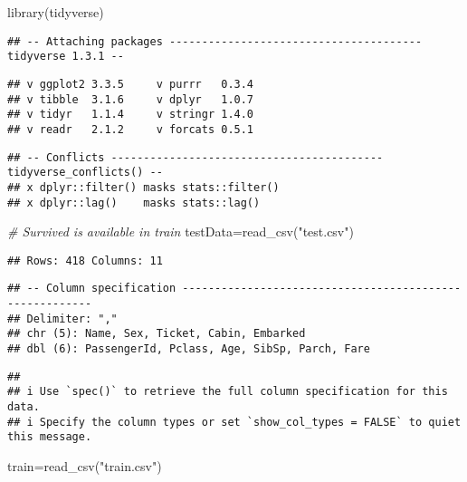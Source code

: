\documentclass[
]{article}
\author{}
\date{\vspace{-2.5em}}
\newenvironment{Shaded}{\begin{snugshade}}{\end{snugshade}}
\newcommand{\CommentTok}[1]{\textcolor[rgb]{0.56,0.35,0.01}{\textit{#1}}}
\newcommand{\FunctionTok}[1]{\textcolor[rgb]{0.00,0.00,0.00}{#1}}
\newcommand{\NormalTok}[1]{#1}
\newcommand{\OtherTok}[1]{\textcolor[rgb]{0.56,0.35,0.01}{#1}}
\newcommand{\StringTok}[1]{\textcolor[rgb]{0.31,0.60,0.02}{#1}}
\begin{document}
\begin{Shaded}
\begin{Highlighting}[]
\FunctionTok{library}\NormalTok{(tidyverse)}
\end{Highlighting}
\end{Shaded}

\begin{verbatim}
## -- Attaching packages --------------------------------------- tidyverse 1.3.1 --
\end{verbatim}

\begin{verbatim}
## v ggplot2 3.3.5     v purrr   0.3.4
## v tibble  3.1.6     v dplyr   1.0.7
## v tidyr   1.1.4     v stringr 1.4.0
## v readr   2.1.2     v forcats 0.5.1
\end{verbatim}

\begin{verbatim}
## -- Conflicts ------------------------------------------ tidyverse_conflicts() --
## x dplyr::filter() masks stats::filter()
## x dplyr::lag()    masks stats::lag()
\end{verbatim}

\begin{Shaded}
\begin{Highlighting}[]
\CommentTok{\# Survived is available in train}
\NormalTok{testData}\OtherTok{=}\FunctionTok{read\_csv}\NormalTok{(}\StringTok{"test.csv"}\NormalTok{)}
\end{Highlighting}
\end{Shaded}

\begin{verbatim}
## Rows: 418 Columns: 11
\end{verbatim}

\begin{verbatim}
## -- Column specification --------------------------------------------------------
## Delimiter: ","
## chr (5): Name, Sex, Ticket, Cabin, Embarked
## dbl (6): PassengerId, Pclass, Age, SibSp, Parch, Fare
\end{verbatim}

\begin{verbatim}
## 
## i Use `spec()` to retrieve the full column specification for this data.
## i Specify the column types or set `show_col_types = FALSE` to quiet this message.
\end{verbatim}

\begin{Shaded}
\begin{Highlighting}[]
\NormalTok{train}\OtherTok{=}\FunctionTok{read\_csv}\NormalTok{(}\StringTok{"train.csv"}\NormalTok{)}
\end{Highlighting}
\end{Shaded}
\end{document}
